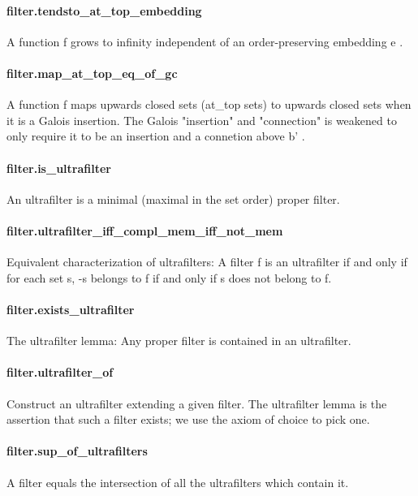 \documentclass{article}
\begin{document}
\paragraph{filter.tendsto\_at\_top\_embedding}
\par
A function 
\colorbox[RGB]{253,246,227}{{{{\color[RGB]{101, 123, 131} f }}}} grows to infinity independent of an order-preserving embedding 
\colorbox[RGB]{253,246,227}{{{{\color[RGB]{101, 123, 131} e }}}}.
\paragraph{filter.map\_at\_top\_eq\_of\_gc}
\par
A function 
\colorbox[RGB]{253,246,227}{{{{\color[RGB]{101, 123, 131} f }}}} maps upwards closed sets (at\_top sets) to upwards closed sets when it is a
Galois insertion. The Galois "insertion" and "connection" is weakened to only require it to be an
insertion and a connetion above 
\colorbox[RGB]{253,246,227}{{{{\color[RGB]{101, 123, 131} b' }}}}.
\paragraph{filter.is\_ultrafilter}
\par
An ultrafilter is a minimal (maximal in the set order) proper filter.
\paragraph{filter.ultrafilter\_iff\_compl\_mem\_iff\_not\_mem}
\par
Equivalent characterization of ultrafilters:
A filter f is an ultrafilter if and only if for each set s,
-s belongs to f if and only if s does not belong to f.
\paragraph{filter.exists\_ultrafilter}
\par
The ultrafilter lemma: Any proper filter is contained in an ultrafilter.
\paragraph{filter.ultrafilter\_of}
\par
Construct an ultrafilter extending a given filter.
The ultrafilter lemma is the assertion that such a filter exists;
we use the axiom of choice to pick one.
\paragraph{filter.sup\_of\_ultrafilters}
\par
A filter equals the intersection of all the ultrafilters which contain it.
\end{document}
